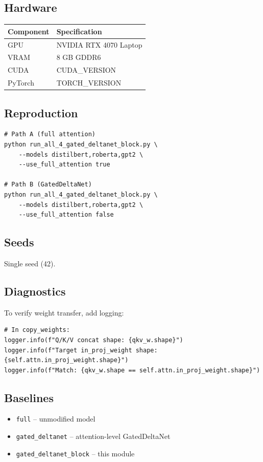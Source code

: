 \subsection{Hardware}

\begin{table}[H]
\centering
\small
\begin{tabular}{ll}
\toprule
\textbf{Component} & \textbf{Specification} \\
\midrule
GPU & NVIDIA RTX 4070 Laptop \\
VRAM & 8 GB GDDR6 \\
CUDA & {{CUDA\_VERSION}} \\
PyTorch & {{TORCH\_VERSION}} \\
\bottomrule
\end{tabular}
\end{table}

\subsection{Reproduction}

\begin{lstlisting}
# Path A (full attention)
python run_all_4_gated_deltanet_block.py \
    --models distilbert,roberta,gpt2 \
    --use_full_attention true

# Path B (GatedDeltaNet)
python run_all_4_gated_deltanet_block.py \
    --models distilbert,roberta,gpt2 \
    --use_full_attention false
\end{lstlisting}

\subsection{Seeds}

Single seed (42).

\subsection{Diagnostics}

To verify weight transfer, add logging:

\begin{lstlisting}
# In copy_weights:
logger.info(f"Q/K/V concat shape: {qkv_w.shape}")
logger.info(f"Target in_proj_weight shape: {self.attn.in_proj_weight.shape}")
logger.info(f"Match: {qkv_w.shape == self.attn.in_proj_weight.shape}")
\end{lstlisting}

\subsection{Baselines}

\begin{itemize}
\item \texttt{full} -- unmodified model
\item \texttt{gated\_deltanet} -- attention-level GatedDeltaNet
\item \texttt{gated\_deltanet\_block} -- this module

\end{itemize}

